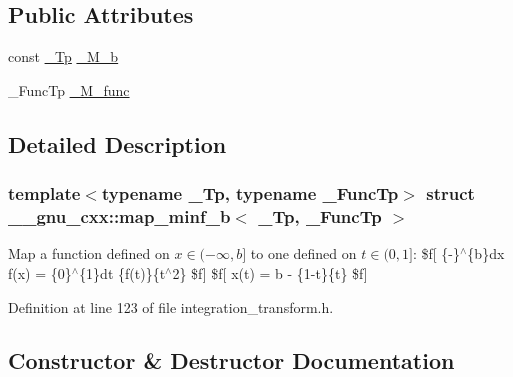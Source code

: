 \subsection*{Public Attributes}
\begin{DoxyCompactItemize}
\item 
const \hyperlink{namespace____gnu__cxx_a3b19a9c800ca194374ef9172290f7d79}{\+\_\+\+Tp} \hyperlink{struct____gnu__cxx_1_1map__minf__b_a03b2c7b30f21200812f87251cd0aff66}{\+\_\+\+M\+\_\+b}
\item 
\+\_\+\+Func\+Tp \hyperlink{struct____gnu__cxx_1_1map__minf__b_a6eeb7b723b6bb691690adfbdec7b4648}{\+\_\+\+M\+\_\+func}
\end{DoxyCompactItemize}


\subsection{Detailed Description}
\subsubsection*{template$<$typename \+\_\+\+Tp, typename \+\_\+\+Func\+Tp$>$\newline
struct \+\_\+\+\_\+gnu\+\_\+cxx\+::map\+\_\+minf\+\_\+b$<$ \+\_\+\+Tp, \+\_\+\+Func\+Tp $>$}

Map a function defined on $ x \in (-\infty, b] $ to one defined on $ t \in (0, 1] $\+: \$f\mbox{[} \{-\/\}$^\wedge$\{b\}dx f(x) = \{0\}$^\wedge$\{1\}dt \{f(t)\}\{t$^\wedge$2\} \$f\mbox{]} \$f\mbox{[} x(t) = b -\/ \{1-\/t\}\{t\} \$f\mbox{]} 

Definition at line 123 of file integration\+\_\+transform.\+h.



\subsection{Constructor \& Destructor Documentation}
\mbox{\label{struct____gnu__cxx_1_1map__minf__b_a55f2ab1a754dcf6068232d8186a194da}} 
